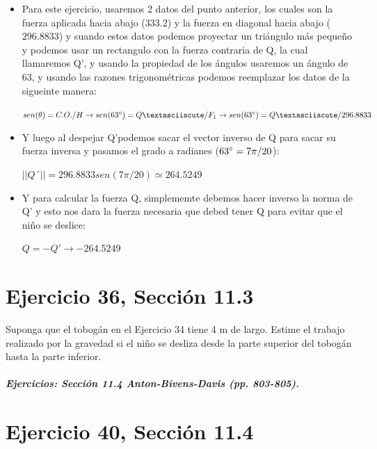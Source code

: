 \documentclass[11pt,letterpaper]{article}
\begin{document}
\begin{itemize}

    \item Para este ejercicio, usaremos 2 datos del punto anterior, los cuales son la fuerza aplicada hacia abajo ($333.2$) y la fuerza en diagonal hacia abajo ($296.8833$) y suando estos datos podemos proyectar un triángulo más pequeño y podemos usar un rectangulo con la fuerza contraria de Q, la cual llamaremos Q', y usando la propiedad de los ángulos usaremos un ángulo de 63\degree, y usando las razones trigonométricas podemos reemplazar los datos de la sigueinte manera:
    \begin{center}
        $sen(\theta) = C.O./H \rightarrow sen(63\degree) = Q´/F_1 \rightarrow sen(63\degree) = Q´/296.8833$
    \end{center}
    \item Y luego al despejar Q'podemos sacar el vector inverso de Q para sacar su fuerza inversa y pasamos el grado a radianes ($63\degree = 7\pi / 20$):
    \begin{center}
        $||Q´|| = 296.8833 sen(7\pi / 20) \simeq 264.5249$
    \end{center}
    \item Y para calcular la fuerza Q, simplememte debemos hacer inverso la norma de Q' y esto nos dara la fuerza necesaria que debed tener Q para evitar que el niño se deslice:
    \begin{center}
        $Q = -Q' \rightarrow -264.5249$
    \end{center}
    
\end{itemize}

\section{Ejercicio 36, Sección 11.3}

Suponga que el tobogán en el Ejercicio 34 tiene 4 m de largo. Estime el trabajo realizado por la gravedad si el niño se desliza desde la parte superior del tobogán hasta la parte inferior.


\subparagraph{Ejercicios: Sección 11.4 Anton-Bivens-Davis (pp. 803-805).}

\section{Ejercicio 40, Sección 11.4}
\end{document}
